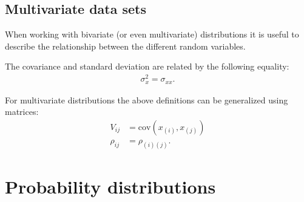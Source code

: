 \subsection{Multivariate data sets}

    When working with bivariate (or even multivariate) distributions it is useful to describe the relationship between the different random variables.

    \begin{property}
        The covariance and standard deviation are related by the following equality:
        \begin{gather}
            \sigma_x^2 = \sigma_{xx}.
        \end{gather}
    \end{property}

    \begin{remark}
        For multivariate distributions the above definitions can be generalized using matrices:
        \begin{align}
            \label{statistics:covariance_matrix}
            V_{ij} &= \mathrm{cov}(x_{(i)},x_{(j)})\\
            \label{statistics:correlation_matrix}
            \rho_{ij} &= \rho_{(i)(j)}.
        \end{align}
    \end{remark}

\section{Probability distributions}

